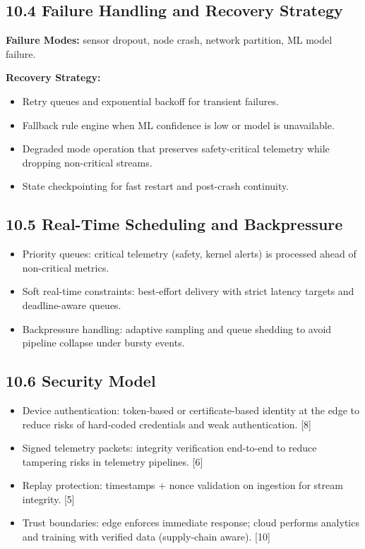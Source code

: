 \documentclass[11pt]{article}
\begin{document}
\subsection{10.4 Failure Handling and Recovery Strategy}
\textbf{Failure Modes:} sensor dropout, node crash, network partition, ML model failure.

\textbf{Recovery Strategy:}
\begin{itemize}
    \item Retry queues and exponential backoff for transient failures.
    \item Fallback rule engine when ML confidence is low or model is unavailable.
    \item Degraded mode operation that preserves safety-critical telemetry while dropping non-critical streams.
    \item State checkpointing for fast restart and post-crash continuity.
\end{itemize}

\subsection{10.5 Real-Time Scheduling and Backpressure}
\begin{itemize}
    \item Priority queues: critical telemetry (safety, kernel alerts) is processed ahead of non-critical metrics.
    \item Soft real-time constraints: best-effort delivery with strict latency targets and deadline-aware queues.
    \item Backpressure handling: adaptive sampling and queue shedding to avoid pipeline collapse under bursty events.
\end{itemize}

\subsection{10.6 Security Model}
\begin{itemize}
    \item Device authentication: token-based or certificate-based identity at the edge to reduce risks of hard-coded credentials and weak authentication. [8]
    \item Signed telemetry packets: integrity verification end-to-end to reduce tampering risks in telemetry pipelines. [6]
    \item Replay protection: timestamps + nonce validation on ingestion for stream integrity. [5]
    \item Trust boundaries: edge enforces immediate response; cloud performs analytics and training with verified data (supply-chain aware). [10]
\end{itemize}
\end{document}
